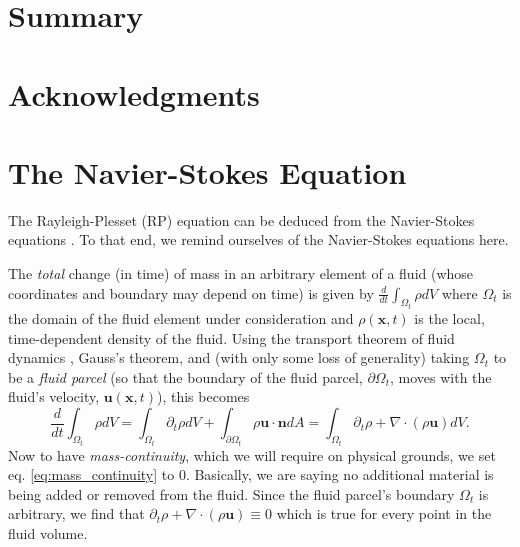 \documentclass[rmp,aps,nofootinbib,superscriptaddress,floatfix]{revtex4-2}
\begin{document}
\section{Summary}

\section{Acknowledgments}

\appendix

\section{The Navier-Stokes Equation}
The Rayleigh-Plesset (RP) equation can be deduced from the Navier-Stokes equations \cite{prosperetti1999old,brenner2002single,prosperetti1986bubble,plesset1977bubble,suslick2008inside,yasui2018acoustic}. To that end, we remind ourselves of the Navier-Stokes equations here. 

The \emph{total} change (in time) of mass in an arbitrary element of a fluid (whose coordinates and boundary may depend on time) is given by  $\frac{d}{dt} \int_{\Omega_t} \rho dV$ where $\Omega_t$ is the domain of the fluid element under consideration and $\rho(\bm{x},t)$ is the local, time-dependent density of the fluid. Using the transport theorem of fluid dynamics \cite{mcdonough2009lectures}, Gauss's theorem, and (with only some loss of generality) taking $\Omega_t$ to be a \emph{fluid parcel} (so that the boundary of the fluid parcel, $\partial \Omega_t$, moves with the fluid's velocity, $\bm{u}(\bm{x},t)$), this becomes
\begin{equation}
    \frac{d}{dt} \int_{\Omega_t} \rho dV = \int_{\Omega_t} \partial_t \rho dV+\int_{\partial \Omega_t} \rho \bm{u} \cdot \bm{n} dA = \int_{\Omega_t} \partial_t \rho+\nabla \cdot(\rho \bm{u})dV.
    \label{eq:mass_continuity}
\end{equation}
Now to have \emph{mass-continuity}, which we will require on physical grounds, we set eq. \ref{eq:mass_continuity} to 0. Basically, we are saying no additional material is being added or removed from the fluid. Since the fluid parcel's boundary $\Omega_t$ is arbitrary, we find that $\partial_t \rho+\nabla\cdot(\rho \bm{u})\equiv 0$ which is true for every point in the fluid volume.
\end{document}
